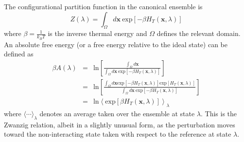 \documentclass[%
 preprint,
 amsmath,amssymb,
 aps,
]{revtex4-1}
\renewcommand{\vec}[1]{{\bm{#1}}}
\begin{document}
The configurational partition function in the canonical ensemble is
\begin{equation}
Z(\lambda) = \int_{\Omega} d\vec{x} \: \mbox{exp} \left[  - \beta H_T (\vec{x},\lambda) \right]
\end{equation} 
where $\beta = \frac{1}{k_BT}$ is the inverse thermal energy and $\Omega$ defines the relevant domain.  An absolute free energy (or a free energy relative to the ideal state) can be defined as
\begin{eqnarray}
\beta A (\lambda) & = & \mbox{ln} \left[ \frac{\int_{\Omega} d\vec{x}}
{ \int_{\Omega} d\vec{x} \: \mbox{exp} \left[  - \beta H_T (\vec{x},\lambda) \right]}  \right] \\
& = &
\mbox{ln} \left[ \frac{\int_{\Omega} d\vec{x}  \mbox{exp} \left[  - \beta H_T (\vec{x},\lambda) \right] 
 \mbox{exp} \left[  H_T (\vec{x},\lambda) \right]}
{ \int_{\Omega} d\vec{x} \: \mbox{exp} \left[  -\beta H_T (\vec{x},\lambda) \right]}  \right] \\
& = & \mbox{ln} \left \langle  \mbox{exp} \left[ \beta H_T (\vec{x},\lambda) \right]
\right \rangle_{\lambda}
\label{e:Zwanzig}
\end{eqnarray}
where $\langle \cdots \rangle_{\lambda}$ denotes an average taken over the ensemble at state $\lambda$.  This is the
Zwanzig relation, albeit in a slightly unusual form, as the perturbation moves toward the non-interacting state 
taken with respect to the reference at state $\lambda$. 
\end{document}
